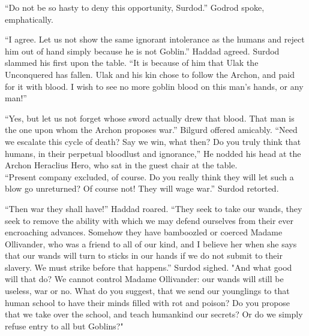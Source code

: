 “Do not be so hasty to deny this opportunity, Surdod.” Godrod spoke, emphatically.

“I agree. Let us not show the same ignorant intolerance as the humans and reject him out of hand simply because he is not Goblin.” Haddad agreed.
\SmallVSpace
Surdod slammed his first upon the table. “It is because of him that Ulak the Unconquered has fallen. Ulak and his kin chose to follow the Archon, and paid for it with blood. I wish to see no more goblin blood on this man’s hands, or any man!”

“Yes, but let us not forget whose sword actually drew that blood. That man is the one upon whom the Archon proposes war.” Bilgurd offered amicably.
\SmallVSpace
“Need we escalate this cycle of death? Say we win, what then? Do you truly think that humans, in their perpetual bloodlust and ignorance,” He nodded his head at the Archon Heraclius Hero, who sat in the guest chair at the table.\\“Present company excluded, of course. Do you really think they will let such a blow go unreturned? Of course not! They will wage war.” Surdod retorted.

“Then war they shall have!” Haddad roared. “They seek to take our wands, they seek to remove the ability with which we may defend ourselves from their ever encroaching advances. Somehow they have bamboozled or coerced Madame Ollivander, who was a friend to all of our kind, and I believe her when she says that our wands will turn to sticks in our hands if we do not submit to their slavery. We must strike before that happens.”
\SmallVSpace
Surdod sighed. "And what good will that do? We cannot control Madame Ollivander: our wands will still be useless, war or no. What do you suggest, that we send our younglings to that human school to have their minds filled with rot and poison? Do you propose that we take over the school, and teach humankind our secrets? Or do we simply refuse entry to all but Goblins?"

